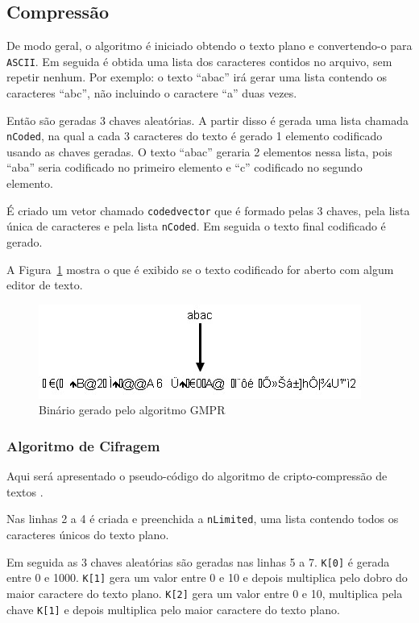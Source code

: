 \subsection{Compressão}

De modo geral, o algoritmo \gmpr é iniciado obtendo o texto plano e convertendo-o para \texttt{ASCII}. Em seguida é obtida uma lista dos caracteres contidos no arquivo, sem repetir nenhum. Por exemplo: o texto ``abac'' irá gerar uma lista contendo os caracteres ``abc'', não incluindo o caractere ``a'' duas vezes.

Então são geradas 3 chaves aleatórias. A partir disso é gerada uma lista chamada \texttt{nCoded}, na qual a cada 3 caracteres do texto é gerado 1 elemento codificado usando as chaves geradas. O texto ``abac'' geraria 2 elementos nessa lista, pois ``aba'' seria codificado no primeiro elemento e ``c'' codificado no segundo elemento.

É criado um vetor chamado \texttt{codedvector} que é formado pelas 3 chaves, pela lista única de caracteres e pela lista \texttt{nCoded}. Em seguida o texto final codificado é gerado.

A Figura~\ref{fig:gmpr} mostra o que é exibido se o texto codificado for aberto com algum editor de texto.

\begin{figure}[t]
    \centering
    \includegraphics{Images/CifraGMPR.jpg}
    \caption{Binário gerado pelo algoritmo GMPR}\label{fig:gmpr}
\end{figure}

\subsubsection{Algoritmo de Cifragem}

Aqui será apresentado o pseudo-código do algoritmo de cripto-compressão de textos \gmpr.

Nas linhas 2 a 4 é criada e preenchida a \texttt{nLimited}, uma lista contendo todos os caracteres únicos do texto plano. 

Em seguida as 3 chaves aleatórias são geradas nas linhas 5 a 7. \texttt{K[0]} é gerada entre 0 e 1000. \texttt{K[1]} gera um valor entre 0 e 10 e depois multiplica pelo dobro do maior caractere do texto plano. \texttt{K[2]} gera um valor entre 0 e 10, multiplica pela chave \texttt{K[1]} e depois multiplica pelo maior caractere do texto plano.

